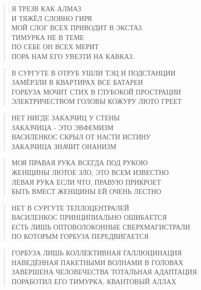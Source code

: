 \poemtitle{***}
\begin{verse}
Я ТРЕЗВ КАК АЛМАЗ\\
И ТЯЖЁЛ СЛОВНО ГИРЯ\\
МОЙ СЛОГ ВСЕХ ПРИВОДИТ В ЭКСТАЗ.\\
ТИМУРКА НЕ В ТЕМЕ\\
ПО СЕБЕ ОН ВСЕХ МЕРИТ\\
ПОРА НАМ ЕГО УВЕЗТИ НА КАВКАЗ.
\end{verse}

\poemtitle{***}
\begin{verse}
В СУРГУТЕ В ОТРУБ УШЛИ ТЭЦ И ПОДСТАНЦИИ\\
ЗАМЁРЗЛИ В КВАРТИРАХ ВСЕ БАТАРЕИ\\
ГОРБУЗА МОЧИТ СТИХ В ГЛУБОКОЙ ПРОСТРАЦИИ\\
ЭЛЕКТРИЧЕСТВОМ ГОЛОВЫ КОЖУРУ ЛЮТО ГРЕЕТ
\end{verse}

\poemtitle{***}
\begin{verse}
НЕТ НИГДЕ ЗАКАЗЧИЦ У СТЕНЫ\\
ЗАКАЗЧИЦА - ЭТО ЭВФЕМИЗМ\\
ВАСИЛЕНКОС СКРЫЛ ОТ НАСТИ ИСТИНУ\\
ЗАКАЗЧИЦА ЗНАЧИТ ОНАНИЗМ
\end{verse}

\poemtitle{***}
\begin{verse}
МОЯ ПРАВАЯ РУКА ВСЕГДА ПОД РУКОЮ\\
ЖЕНЩИНЫ ЛЮТОЕ ЗЛО, ЭТО ВСЕМ ИЗВЕСТНО\\
ЛЕВАЯ РУКА ЕСЛИ ЧТО, ПРАВУЮ ПРИКРОЕТ\\
БЫТЬ ВМЕСТ ЖЕНЩИНЫ ЕЙ ОЧЕНЬ ЛЕСТНО
\end{verse}

\poemtitle{***}
\begin{verse}
НЕТ В СУРГУТЕ ТЕПЛОЦЕНТРАЛЕЙ\\
ВАСИЛЕНКОС ПРИНЦИПИАЛЬНО ОШИБАЕТСЯ\\
ЕСТЬ ЛИШЬ ОПТОВОЛОКОННЫЕ СВЕРХМАГИСТРАЛИ\\
ПО КОТОРЫМ ГОРБУЗА ПЕРЕДВИГАЕТСЯ
\end{verse}

\poemtitle{***}
\begin{verse}
ГОРБУЗА ЛИШЬ КОЛЛЕКТИВНАЯ ГАЛЛЮЦИНАЦИЯ\\
НАВЕДЁННАЯ ПАКЕТНЫМИ ВОЛНАМИ В ГОЛОВАХ\\
ЗАВЕРШЕНА ЧЕЛОВЕЧЕСТВА ТОТАЛЬНАЯ АДАПТАЦИЯ\\
ПОРАБОТИЛ ЕГО ТИМУРКА, КВАНТОВЫЙ АЛЛАХ
\end{verse}

